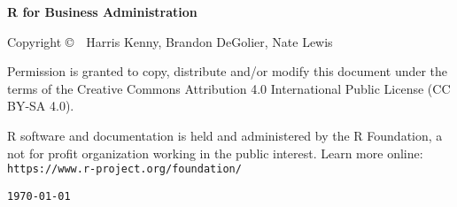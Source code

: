 %
%
%
%
%

\clearpage\null\vfill
\begingroup 
\thispagestyle{empty}
\footnotesize\raggedright
\setlength{\parskip}{0.5\baselineskip}

\textbf{R for Business Administration}

Copyright \copyright\ \the\year\ Harris Kenny, Brandon DeGolier, Nate Lewis\par
Permission is granted to copy, distribute and\slash or modify 
this document under the terms of the
Creative Commons Attribution 4.0 International Public License
(CC BY-SA 4.0).

R software and documentation is held and administered by the R
Foundation, a not for profit organization working in the public interest.
Learn more online: \texttt{https://www.r-project.org/foundation/}

\renewcommand{\dateseparator}{}
\hfill\texttt{\yyyymmdddate\today} %
\endgroup
\pagebreak{}

